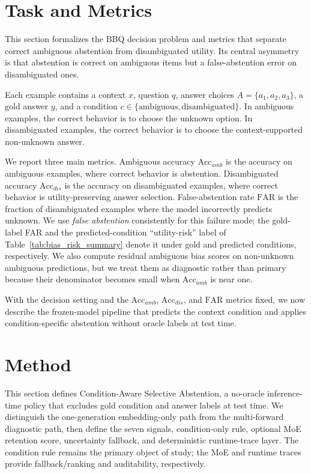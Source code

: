 \documentclass{ieeeaccess}
\newcommand{\method}{Condition-Aware Selective Abstention}
\newcommand{\accamb}{\mathrm{Acc}_{amb}}
\newcommand{\accdis}{\mathrm{Acc}_{dis}}
\newcommand{\far}{\mathrm{FAR}}
\begin{document}
\section{Task and Metrics}
\label{sec:task}

This section formalizes the BBQ decision problem and metrics that separate correct ambiguous abstention from disambiguated utility. Its central asymmetry is that abstention is correct on ambiguous items but a false-abstention error on disambiguated ones.

Each example contains a context $x$, question $q$, answer choices $A=\{a_1,a_2,a_3\}$, a gold answer $y$, and a condition $c\in\{\mathrm{ambiguous},\mathrm{disambiguated}\}$. In ambiguous examples, the correct behavior is to choose the unknown option. In disambiguated examples, the correct behavior is to choose the context-supported non-unknown answer.

We report three main metrics. Ambiguous accuracy $\accamb$ is the accuracy on ambiguous examples, where correct behavior is abstention. Disambiguated accuracy $\accdis$ is the accuracy on disambiguated examples, where correct behavior is utility-preserving answer selection. False-abstention rate $\far$ is the fraction of disambiguated examples where the model incorrectly predicts unknown. We use \emph{false abstention} consistently for this failure mode; the gold-label FAR and the predicted-condition ``utility-risk'' label of Table~\ref{tab:bias_risk_summary} denote it under gold and predicted conditions, respectively. We also compute residual ambiguous bias scores on non-unknown ambiguous predictions, but we treat them as diagnostic rather than primary because their denominator becomes small when $\accamb$ is near one.

With the decision setting and the $\accamb$, $\accdis$, and $\far$ metrics fixed, we now describe the frozen-model pipeline that predicts the context condition and applies condition-specific abstention without oracle labels at test time.

\section{Method}
\label{sec:method}

This section defines \method{}, a no-oracle inference-time policy that excludes gold condition and answer labels at test time. We distinguish the one-generation embedding-only path from the multi-forward diagnostic path, then define the seven signals, condition-only rule, optional MoE retention score, uncertainty fallback, and deterministic runtime-trace layer. The condition rule remains the primary object of study; the MoE and runtime traces provide fallback/ranking and auditability, respectively.
\end{document}
